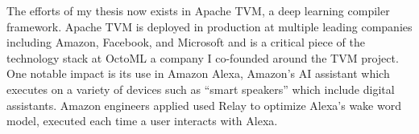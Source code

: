 \begin{fullwidth}
\begin{center}
\begin{flushleft}
The efforts of my thesis now exists in Apache TVM, a deep learning compiler framework.
Apache TVM is deployed in production at multiple leading companies including
  Amazon, Facebook, and Microsoft and is a critical piece of the technology stack
  at OctoML a company I co-founded around the TVM project.
One notable impact is its use in Amazon Alexa, Amazon's AI assistant
  which executes on a variety of devices such as ``smart speakers'' which include
  digital assistants.
Amazon engineers applied used Relay to optimize Alexa’s wake word model,
  executed each time a user interacts with Alexa.

\end{flushleft}
\end{center}
\end{fullwidth}
